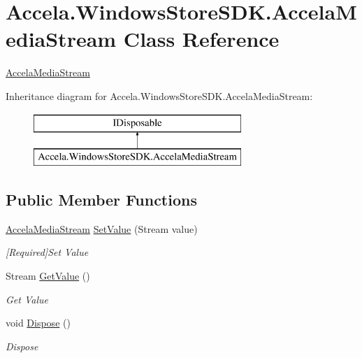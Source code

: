 \hypertarget{class_accela_1_1_windows_store_s_d_k_1_1_accela_media_stream}{\section{Accela.\+Windows\+Store\+S\+D\+K.\+Accela\+Media\+Stream Class Reference}
\label{class_accela_1_1_windows_store_s_d_k_1_1_accela_media_stream}
}


\hyperlink{class_accela_1_1_windows_store_s_d_k_1_1_accela_media_stream}{Accela\+Media\+Stream}  


Inheritance diagram for Accela.\+Windows\+Store\+S\+D\+K.\+Accela\+Media\+Stream\+:\begin{figure}[H]
\begin{center}
\leavevmode
\includegraphics[height=2.000000cm]{class_accela_1_1_windows_store_s_d_k_1_1_accela_media_stream}
\end{center}
\end{figure}
\subsection*{Public Member Functions}
\begin{DoxyCompactItemize}
\item 
\hyperlink{class_accela_1_1_windows_store_s_d_k_1_1_accela_media_stream}{Accela\+Media\+Stream} \hyperlink{class_accela_1_1_windows_store_s_d_k_1_1_accela_media_stream_af0970b7976ce40775bba5f7fbfff5ac1}{Set\+Value} (Stream value)
\begin{DoxyCompactList}\small\item\em \mbox{[}Required\mbox{]}Set Value \end{DoxyCompactList}\item 
Stream \hyperlink{class_accela_1_1_windows_store_s_d_k_1_1_accela_media_stream_ab1b821f9c6f832681133bb89524c16ff}{Get\+Value} ()
\begin{DoxyCompactList}\small\item\em Get Value \end{DoxyCompactList}\item 
void \hyperlink{class_accela_1_1_windows_store_s_d_k_1_1_accela_media_stream_a32886b81ce8f4266c1d90c4abd9fcfbc}{Dispose} ()
\begin{DoxyCompactList}\small\item\em Dispose \end{DoxyCompactList}\end{DoxyCompactItemize}
